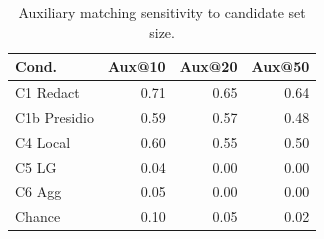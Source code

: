 \begin{table}[t]
\centering
\small
\setlength{\tabcolsep}{3pt}
\caption{Auxiliary matching sensitivity to candidate set size.}
\label{tab:candidate_sensitivity}
\begin{tabular}{lrrr}
\toprule
Cond. & Aux@10 & Aux@20 & Aux@50 \\
\midrule
C1 Redact & 0.71 & 0.65 & 0.64 \\
C1b Presidio & 0.59 & 0.57 & 0.48 \\
C4 Local & 0.60 & 0.55 & 0.50 \\
C5 LG & 0.04 & 0.00 & 0.00 \\
C6 Agg & 0.05 & 0.00 & 0.00 \\
Chance & 0.10 & 0.05 & 0.02 \\
\bottomrule
\end{tabular}
\end{table}
